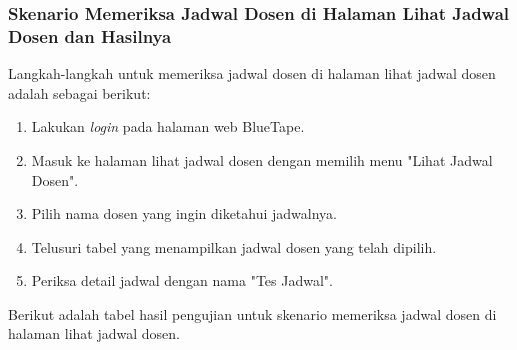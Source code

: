 \subsubsection{Skenario Memeriksa Jadwal Dosen di Halaman Lihat Jadwal Dosen dan Hasilnya}
\label{subsubsec:skenario_memeriksa_jadwal_dosen_di_halaman_lihat_jadwal_dosen}
Langkah-langkah untuk memeriksa jadwal dosen di halaman lihat jadwal dosen adalah sebagai berikut:

\begin{enumerate}
    \item Lakukan \textit{login} pada halaman web BlueTape.
    \item Masuk ke halaman lihat jadwal dosen dengan memilih menu "Lihat Jadwal Dosen".
    \item Pilih nama dosen yang ingin diketahui jadwalnya.
    \item Telusuri tabel yang menampilkan jadwal dosen yang telah dipilih.
    \item Periksa detail jadwal dengan nama "Tes Jadwal".
\end{enumerate}

Berikut adalah tabel hasil pengujian untuk skenario memeriksa jadwal dosen di halaman lihat jadwal dosen.

